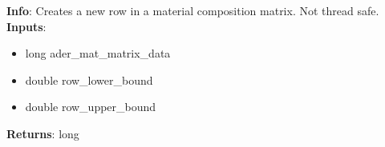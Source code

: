 \textbf{Info}: Creates a new row in a material composition matrix. Not thread
safe. \\

\noindent \textbf{Inputs}:
\begin{itemize}
\item{long ader\_mat\_matrix\_data}
\item{double row\_lower\_bound}
\item{double row\_upper\_bound}
\end{itemize}

\noindent \textbf{Returns}: long
